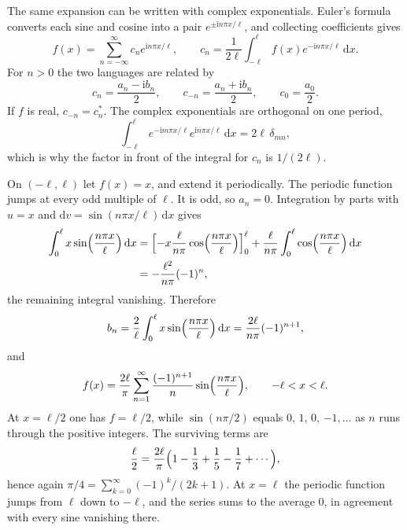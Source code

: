 The same expansion can be written with complex exponentials. Euler's formula converts each sine and cosine into a pair $e^{\pm\mathrm{i}n\pi x/\ell}$, and collecting coefficients gives
\begin{equation}
f(x)=\sum_{n=-\infty}^{\infty}c_ne^{\mathrm{i}n\pi x/\ell},
\qquad
c_n=\frac{1}{2\ell}\int_{-\ell}^{\ell}f(x)e^{-\mathrm{i}n\pi x/\ell}\,\mathrm{d}x.
\label{eq:ch05-complex-series}
\end{equation}
For $n>0$ the two languages are related by
\begin{equation}
c_n=\frac{a_n-\mathrm{i}b_n}{2},
\qquad
c_{-n}=\frac{a_n+\mathrm{i}b_n}{2},
\qquad
c_0=\frac{a_0}{2}.
\end{equation}
If $f$ is real, $c_{-n}=c_n^*$. The complex exponentials are orthogonal on one period,
\begin{equation}
\int_{-\ell}^{\ell}e^{-\mathrm{i}m\pi x/\ell}e^{\mathrm{i}n\pi x/\ell}\,\mathrm{d}x=2\ell\,\delta_{mn},
\end{equation}
which is why the factor in front of the integral for $c_n$ is $1/(2\ell)$.

\begin{example}[The sawtooth $f(x)=x$]
On $(-\ell,\ell)$ let $f(x)=x$, and extend it periodically. The periodic function jumps at every odd multiple of $\ell$. It is odd, so $a_n=0$. Integration by parts with $u=x$ and $\mathrm{d}v=\sin(n\pi x/\ell)\,\mathrm{d}x$ gives
\begin{align}
\int_0^{\ell}x\sin\Bigl(\frac{n\pi x}{\ell}\Bigr)\,\mathrm{d}x
&=\Bigl[-x\frac{\ell}{n\pi}\cos\Bigl(\frac{n\pi x}{\ell}\Bigr)\Bigr]_0^{\ell}
+\frac{\ell}{n\pi}\int_0^{\ell}\cos\Bigl(\frac{n\pi x}{\ell}\Bigr)\,\mathrm{d}x
\nonumber\\
&=-\frac{\ell^2}{n\pi}(-1)^n,
\end{align}
the remaining integral vanishing. Therefore
\begin{equation}
b_n=\frac{2}{\ell}\int_0^{\ell}x\sin\Bigl(\frac{n\pi x}{\ell}\Bigr)\,\mathrm{d}x
=\frac{2\ell}{n\pi}(-1)^{n+1},
\end{equation}
and
\begin{equation}
f(x)=\frac{2\ell}{\pi}\sum_{n=1}^{\infty}
\frac{(-1)^{n+1}}{n}\sin\Bigl(\frac{n\pi x}{\ell}\Bigr),
\qquad -\ell<x<\ell.
\label{eq:ch05-sawtooth}
\end{equation}
At $x=\ell/2$ one has $f=\ell/2$, while $\sin(n\pi/2)$ equals $0$, $1$, $0$, $-1,\ldots$ as $n$ runs through the positive integers. The surviving terms are
\begin{equation}
\frac{\ell}{2}=\frac{2\ell}{\pi}\Bigl(1-\frac13+\frac15-\frac17+\cdots\Bigr),
\end{equation}
hence again $\pi/4=\sum_{k=0}^{\infty}(-1)^k/(2k+1)$. At $x=\ell$ the periodic function jumps from $\ell$ down to $-\ell$, and the series sums to the average $0$, in agreement with every sine vanishing there.
\end{example}

